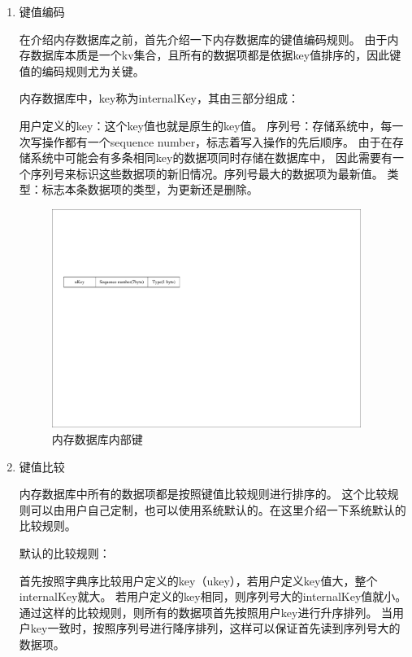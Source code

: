 		\begin{enumerate}
			\item 键值编码
			
			在介绍内存数据库之前，首先介绍一下内存数据库的键值编码规则。
			由于内存数据库本质是一个kv集合，且所有的数据项都是依据key值排序的，因此键值的编码规则尤为关键。

			内存数据库中，key称为internalKey，其由三部分组成：

			用户定义的key：这个key值也就是原生的key值。
			序列号：存储系统中，每一次写操作都有一个sequence number，标志着写入操作的先后顺序。
			由于在存储系统中可能会有多条相同key的数据项同时存储在数据库中，
			因此需要有一个序列号来标识这些数据项的新旧情况。序列号最大的数据项为最新值。
			类型：标志本条数据项的类型，为更新还是删除。

			\begin{figure}[H]
				\centering
				\includegraphics[width=0.95\textwidth]{pdf/internalkey}
				\caption{内存数据库内部键}
				\label{internalkey}
			\end{figure}

			\item 键值比较
			
			内存数据库中所有的数据项都是按照键值比较规则进行排序的。
			这个比较规则可以由用户自己定制，也可以使用系统默认的。在这里介绍一下系统默认的比较规则。

			默认的比较规则：

			首先按照字典序比较用户定义的key（ukey），若用户定义key值大，整个internalKey就大。
			若用户定义的key相同，则序列号大的internalKey值就小。
			通过这样的比较规则，则所有的数据项首先按照用户key进行升序排列。
			当用户key一致时，按照序列号进行降序排列，这样可以保证首先读到序列号大的数据项。



\end{enumerate}
